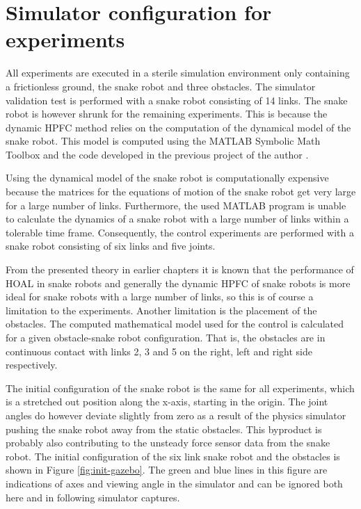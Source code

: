 \section{Simulator configuration for experiments}\label{sec:sim-config-exp}

All experiments are executed in a sterile simulation environment only containing a frictionless ground, the snake robot and three obstacles. The simulator validation test is performed with a snake robot consisting of 14 links. The snake robot is however shrunk for the remaining experiments. This is because the dynamic HPFC method relies on the computation of the dynamical model of the snake robot. This model is computed using the MATLAB Symbolic Math Toolbox \cite{matlabsymbolic} and the code developed in the previous project of the author \cite{AtussaProsjektoppgp}.

Using the dynamical model of the snake robot is computationally expensive because the matrices for the equations of motion of the snake robot get very large for a large number of links. Furthermore, the used MATLAB program is unable to calculate the dynamics of a snake robot with a large number of links within a tolerable time frame. Consequently, the control experiments are performed with a snake robot consisting of six links and five joints.

From the presented theory in earlier chapters it is known that the performance of HOAL in snake robots and generally the dynamic HPFC of snake robots is more ideal for snake robots with a large number of links, so this is of course a limitation to the experiments. Another limitation is the placement of the obstacles. The computed mathematical model used for the control is calculated for a given obstacle-snake robot configuration. That is, the obstacles are in continuous contact with links 2, 3 and 5 on the right, left and right side respectively.

The initial configuration of the snake robot is the same for all experiments, which is a stretched out position along the x-axis, starting in the origin. The joint angles do however deviate slightly from zero as a result of the physics simulator pushing the snake robot away from the static obstacles. This byproduct is probably also contributing to the unsteady force sensor data from the snake robot. The initial configuration of the six link snake robot and the obstacles is shown in Figure \ref{fig:init-gazebo}. The green and blue lines in this figure are indications of axes and viewing angle in the simulator and can be ignored both here and in following simulator captures.

